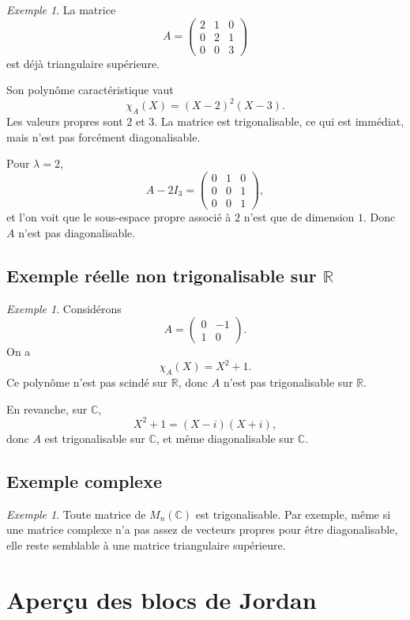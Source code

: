 \documentclass[11pt,a4paper]{article}
\theoremstyle{remark}
\newtheorem{exemple}[definition]{Exemple}
\newcommand{\R}{\mathbb{R}}
\newcommand{\C}{\mathbb{C}}
\begin{document}
\begin{exemple}
La matrice
\[
A=
\begin{pmatrix}
2 & 1 & 0\\
0 & 2 & 1\\
0 & 0 & 3
\end{pmatrix}
\]
est déjà triangulaire supérieure.

Son polynôme caractéristique vaut
\[
\chi_A(X)=(X-2)^2(X-3).
\]
Les valeurs propres sont \(2\) et \(3\). La matrice est trigonalisable, ce qui est immédiat, mais n’est pas forcément diagonalisable.

Pour \(\lambda=2\),
\[
A-2I_3=
\begin{pmatrix}
0 & 1 & 0\\
0 & 0 & 1\\
0 & 0 & 1
\end{pmatrix},
\]
et l’on voit que le sous-espace propre associé à \(2\) n’est que de dimension \(1\). Donc \(A\) n’est pas diagonalisable.
\end{exemple}

\subsection{Exemple réelle non trigonalisable sur \(\R\)}

\begin{exemple}
Considérons
\[
A=
\begin{pmatrix}
0 & -1\\
1 & 0
\end{pmatrix}.
\]
On a
\[
\chi_A(X)=X^2+1.
\]
Ce polynôme n’est pas scindé sur \(\R\), donc \(A\) n’est pas trigonalisable sur \(\R\).

En revanche, sur \(\C\),
\[
X^2+1=(X-i)(X+i),
\]
donc \(A\) est trigonalisable sur \(\C\), et même diagonalisable sur \(\C\).
\end{exemple}

\subsection{Exemple complexe}

\begin{exemple}
Toute matrice de \(M_n(\C)\) est trigonalisable.  
Par exemple, même si une matrice complexe n’a pas assez de vecteurs propres pour être diagonalisable, elle reste semblable à une matrice triangulaire supérieure.
\end{exemple}

\section{Aperçu des blocs de Jordan}
\end{document}
